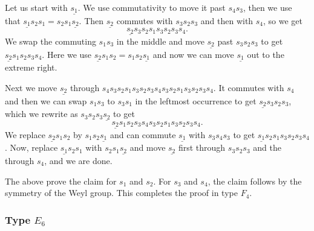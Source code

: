 \documentclass[a4paper]{amsart}
\begin{document}
Let us start with $\underline{s_{1}}$. We use commutativity to move it
past $s_4s_3$, then we use that $\underline{s_{1}}s_2s_1=s_2s_1\underline{s_{2}}$.
Then $\underline{s_{2}}$ commutes with $s_3s_2s_3$ and then with
$s_4$, so we get 
\begin{displaymath}
\underline{s_{2}}s_3s_2s_1s_3s_2s_3s_4.
\end{displaymath}
We swap the commuting $s_1s_3$ in the middle and move
$\underline{s_{2}}$ past $s_3s_2s_3$ to get
$\underline{s_{2}}s_1s_2s_3s_4$. Here we use
$\underline{s_{2}}s_1s_2=s_1s_2\underline{s_{1}}$ and now we can move
$\underline{s_{1}}$ out to the extreme right.

Next we move $\underline{s_{2}}$ through
$s_4s_3s_2s_1s_3s_2s_3s_4s_3s_2s_1s_3s_2s_3s_4$.
It commutes with $s_4$ and then we can swap $s_1s_3$
to $s_3s_1$ in the leftmost occurrence to get
$\underline{s_{2}}s_3s_2s_3$, which we rewrite as
$s_3s_2s_3\underline{s_{2}}$ to get 
\begin{displaymath}
\underline{s_{2}}s_1s_2s_3s_4s_3s_2s_1s_3s_2s_3s_4.
\end{displaymath}
We replace $\underline{s_{2}}s_1s_2$ by 
$s_1s_2\underline{s_{1}}$ and can commute $\underline{s_{1}}$
with $s_3s_4s_3$ to get $\underline{s_{1}}s_2s_1s_3s_2s_3s_4$.
Now, replace $\underline{s_{1}}s_2s_1$ with
$s_2s_1\underline{s_{2}}$ and move $\underline{s_{2}}$
first through $s_3s_2s_3$ and the through $s_4$, and we are done.

The above prove the claim for $s_1$ and $s_2$. For
$s_3$ and $s_4$, the claim follows by the symmetry of the 
Weyl group. This completes the proof in type $F_4$.

\subsubsection{\bf Type $E_6$}\label{s5.2.5}
\end{document}
